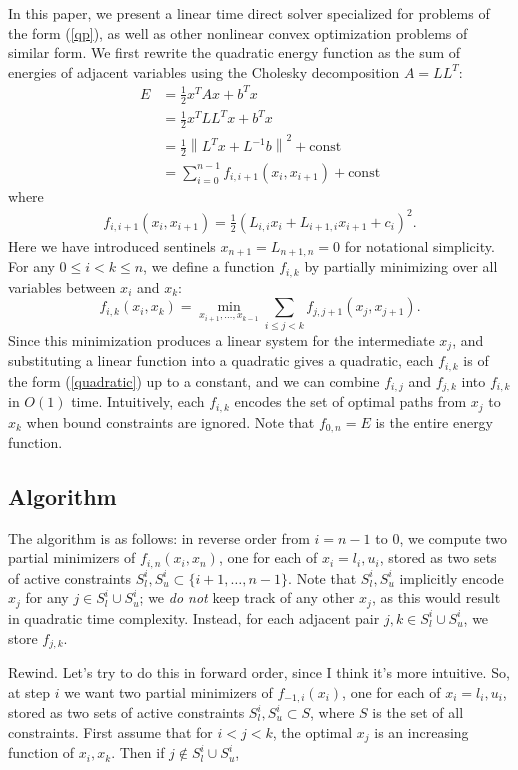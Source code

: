 \documentclass[11pt]{article}
\begin{document}
In this paper, we present a linear time direct solver specialized for problems of the form (\ref{qp}), as well as other nonlinear convex optimization problems of similar form.  We first rewrite the quadratic
energy function as the sum of energies of adjacent variables using the Cholesky decomposition $A = LL^T$:
\begin{align*}
E &= \frac{1}{2} x^T A x + b^T x  \\
  &= \frac{1}{2} x^T L L^T x + b^T x \\ 
  &= \frac{1}{2} \left\|L^T x + L^{-1}b \right\|^2 + \textrm{const} \\
  &= \sum_{i=0}^{n-1} f_{i,i+1}(x_i,x_{i+1}) + \textrm{const}
\end{align*}
where
\begin{align} \label{quadratic}
f_{i,i+1}(x_i,x_{i+1}) = \frac{1}{2} (L_{i,i} x_i + L_{i+1,i} x_{i+1} + c_i)^2.
\end{align}
Here we have introduced sentinels $x_{n+1} = L_{n+1,n} = 0$ for notational simplicity.  For any $0 \le i < k \le n$, we define a function $f_{i,k}$ by partially minimizing over all variables between $x_i$ and $x_k$:
$$f_{i,k}(x_i,x_k) = \min_{x_{i+1}, \ldots, x_{k-1}} \sum_{i \le j < k} f_{j,j+1}(x_j,x_{j+1}).$$
Since this minimization produces a linear system for the intermediate $x_j$, and substituting a linear function into a quadratic gives a quadratic, each $f_{i,k}$ is of the form (\ref{quadratic}) up to a constant,
and we can combine $f_{i,j}$ and $f_{j,k}$ into $f_{i,k}$ in $O(1)$ time.  Intuitively, each $f_{i,k}$ encodes the set of optimal paths from $x_j$ to $x_k$ when bound constraints are ignored.  Note that $f_{0,n} = E$
is the entire energy function.

\subsection{Algorithm}

The algorithm is as follows: in reverse order from $i = n-1$ to $0$, we compute two partial minimizers of $f_{i,n}(x_i,x_n)$, one for each of $x_i = l_i, u_i$, stored as two sets of active constraints
$S_l^i, S_u^i \subset \{i+1, \ldots, n-1\}$.
Note that $S_l^i, S_u^i$ implicitly encode $x_j$ for any $j \in S_l^i \cup S_u^i$; we \emph{do not} keep track of any other $x_j$, as this would result in quadratic time complexity.  Instead, for each adjacent pair
$j,k \in S_l^i \cup S_u^i$, we store $f_{j,k}$.

Rewind.  Let's try to do this in forward order, since I think it's more intuitive.  So, at step $i$ we want two partial minimizers of $f_{-1,i}(x_i)$, one for each of $x_i = l_i, u_i$, stored as two sets of active
constraints $S_l^i, S_u^i \subset S$, where $S$ is the set of all constraints.  First assume that for $i < j < k$, the optimal $x_j$ is an increasing function of $x_i, x_k$.  Then if $j \notin S_l^i \cup S_u^i$, 
\end{document}
